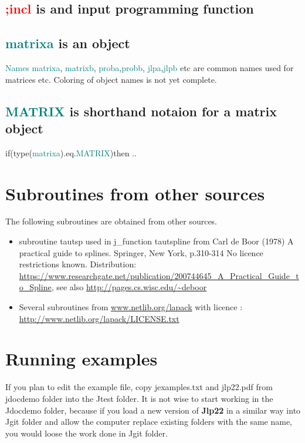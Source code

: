 \subsection{\textcolor{Red}{;incl} is and input programming function} 
\label{wrinpu} 
\subsection{\textcolor{teal}{matrixa} is an object} 
\label{wrobj} 
\textcolor{teal}{Names} \textcolor{teal}{matrixa}, \textcolor{teal}{matrixb}, \textcolor{teal}{proba},\textcolor{teal}{probb}, \textcolor{teal}{jlpa},\textcolor{teal}{jlpb} etc 
are common names used for matrices etc. Coloring of object names is not yet complete. 
\subsection{\textcolor{teal}{MATRIX} is shorthand notaion for a matrix object} 
\label{wrtype} 
\textcolor{VioletRed}{if}(\textcolor{VioletRed}{type}(\textcolor{teal}{matrixa}).eq.\textcolor{teal}{MATRIX})\textcolor{VioletRed}{then} .. 
\section{Subroutines from other sources} 
\label{license} 
The following subroutines are obtained from other sources. 
\begin{itemize} 
 
\item  subroutine tautsp used in j\_function tautspline 
from Carl de Boor (1978) A practical guide to splines. Springer, New York, p.310-314 
No licence restrictions known. 
Distribution: \\ 
\url{https://www.researchgate.net/publication/200744645_A_Practical_Guide_to_Spline}, 
see also \url{ http://pages.cs.wisc.edu/~deboor} 
 
 
 
\item Several subroutines from \url{www.netlib.org/lapack} 
with licence :\\ 
\url{http://www.netlib.org/lapack/LICENSE.txt} 
\end{itemize} 
\section{Running examples} 
\label{runex} 
 
If you plan to edit the example file, copy jexamples.txt and jlp22.pdf  from jdocdemo folder into the Jtest folder. 
It is not wise to start 
working in the Jdocdemo folder, because if you load a new version of \textbf{Jlp22} in a similar way into Jgit folder 
and allow the computer replace existing folders with the same name, 
you would loose the work done in Jgit folder. 
 
